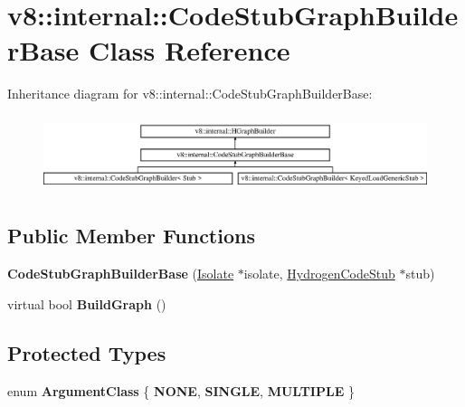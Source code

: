 \hypertarget{classv8_1_1internal_1_1_code_stub_graph_builder_base}{}\section{v8\+:\+:internal\+:\+:Code\+Stub\+Graph\+Builder\+Base Class Reference}
\label{classv8_1_1internal_1_1_code_stub_graph_builder_base}
Inheritance diagram for v8\+:\+:internal\+:\+:Code\+Stub\+Graph\+Builder\+Base\+:\begin{figure}[H]
\begin{center}
\leavevmode
\includegraphics[height=2.234043cm]{classv8_1_1internal_1_1_code_stub_graph_builder_base}
\end{center}
\end{figure}
\subsection*{Public Member Functions}
\begin{DoxyCompactItemize}
\item 
\hypertarget{classv8_1_1internal_1_1_code_stub_graph_builder_base_a2f1866fca7977a3b222abb615d3e8f4f}{}{\bfseries Code\+Stub\+Graph\+Builder\+Base} (\hyperlink{classv8_1_1internal_1_1_isolate}{Isolate} $\ast$isolate, \hyperlink{classv8_1_1internal_1_1_hydrogen_code_stub}{Hydrogen\+Code\+Stub} $\ast$stub)\label{classv8_1_1internal_1_1_code_stub_graph_builder_base_a2f1866fca7977a3b222abb615d3e8f4f}

\item 
\hypertarget{classv8_1_1internal_1_1_code_stub_graph_builder_base_adb8f28c53e03631c88ecb2c0ebfb3951}{}virtual bool {\bfseries Build\+Graph} ()\label{classv8_1_1internal_1_1_code_stub_graph_builder_base_adb8f28c53e03631c88ecb2c0ebfb3951}

\end{DoxyCompactItemize}
\subsection*{Protected Types}
\begin{DoxyCompactItemize}
\item 
\hypertarget{classv8_1_1internal_1_1_code_stub_graph_builder_base_a0bb263d66bbbaf563618e4b55759a855}{}enum {\bfseries Argument\+Class} \{ {\bfseries N\+O\+N\+E}, 
{\bfseries S\+I\+N\+G\+L\+E}, 
{\bfseries M\+U\+L\+T\+I\+P\+L\+E}
 \}\label{classv8_1_1internal_1_1_code_stub_graph_builder_base_a0bb263d66bbbaf563618e4b55759a855}

\end{DoxyCompactItemize}
